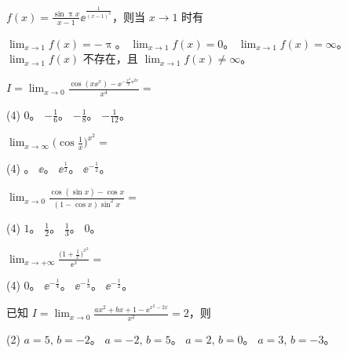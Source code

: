 \begin{ti}
	$f(x) = \frac{\sin \uppi x}{x-1} \ee^{\frac{1}{(x-1)^3}}$，则当 $x \to 1$ 时有
	\begin{tasks}
		\task $\lim_{x \to 1} f(x) = - \uppi$。
		\task $\lim_{x \to 1} f(x) = 0$。
		\task $\lim_{x \to 1} f(x) = \infty$。
		\task $\lim_{x \to 1} f(x)$ 不存在，且 $\lim_{x \to 1} f(x) \ne \infty$。
	\end{tasks}
\end{ti}

\begin{ti}
	$I = \lim_{x \to 0} \frac{\cos( x\ee^x ) - \ee^{-\frac{x^2}{2} \ee^{2x}}}{x^4} = $
	\begin{tasks}(4)
		\task $0$。
		\task $-\frac{1}{6}$。
		\task $-\frac{1}{8}$。
		\task $-\frac{1}{12}$。
	\end{tasks}
\end{ti}

\begin{ti}
	$\lim_{x \to \infty} \biggl( \cos\frac{1}{x} \biggr)^{x^2} = $
	\begin{tasks}(4)
		\task 1。
		\task $\ee$。
		\task $\ee^{\frac{1}{2}}$。
		\task $\ee^{-\frac{1}{2}}$。
	\end{tasks}
\end{ti}

\begin{ti}
	$\lim_{x \to 0} \frac{\cos(\sin x) - \cos x}{(1 - \cos x) \sin^2x} = $
	\begin{tasks}(4)
		\task $1$。
		\task $\frac{1}{2}$。
		\task $\frac{1}{3}$。
		\task $0$。
	\end{tasks}
\end{ti}

\begin{ti}
	$\lim_{x \to +\infty} \frac{\bigl( 1 + \frac{1}{x} \bigr)^{x^2}}{\ee^x} = $
	\begin{tasks}(4)
		\task $0$。
		\task $\ee^{-\frac{1}{4}}$。
		\task $\ee^{-\frac{1}{3}}$。
		\task $\ee^{-\frac{1}{2}}$。
	\end{tasks}
\end{ti}

\begin{ti}
	已知 $I = \lim_{x \to 0} \frac{ax^2 + bx + 1 - \ee^{x^2-2x}}{x^2} = 2$，则
	\begin{tasks}(2)
		\task $a = 5$, $b = -2$。
		\task $a = -2$, $b = 5$。
		\task $a = 2$, $b = 0$。
		\task $a = 3$, $b = -3$。
	\end{tasks}
\end{ti}

